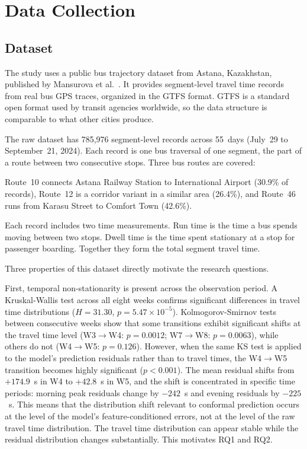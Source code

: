 \documentclass[12pt, a4paper, oneside]{report}
\begin{document}
\section{Data Collection}
\label{sec:data_collection}

\subsection{Dataset}
\label{subsec:dataset}

The study uses a public bus trajectory dataset from Astana, Kazakhstan, published by Mansurova et al.~\cite{mansurova2025dataset}. It provides segment-level travel time records from real bus GPS traces, organized in the GTFS format. GTFS is a standard open format used by transit agencies worldwide, so the data structure is comparable to what other cities produce.

The raw dataset has 785,976 segment-level records across 55~days (July~29 to September~21, 2024). Each record is one bus traversal of one segment, the part of a route between two consecutive stops. Three bus routes are covered:

Route~10 connects Astana Railway Station to International Airport (30.9\% of records), Route~12 is a corridor variant in a similar area (26.4\%), and Route~46 runs from Karasu Street to Comfort Town (42.6\%).

Each record includes two time measurements. Run time is the time a bus spends moving between two stops. Dwell time is the time spent stationary at a stop for passenger boarding. Together they form the total segment travel time.

Three properties of this dataset directly motivate the research questions.

First, temporal non-stationarity is present across the observation period. A Kruskal-Wallis test across all eight weeks confirms significant differences in travel time distributions ($H=31.30$, $p=5.47\times10^{-5}$). Kolmogorov-Smirnov tests between consecutive weeks show that some transitions exhibit significant shifts at the travel time level (W3$\rightarrow$W4: $p=0.0012$; W7$\rightarrow$W8: $p=0.0063$), while others do not (W4$\rightarrow$W5: $p=0.126$). However, when the same KS test is applied to the model's prediction residuals rather than to travel times, the W4$\rightarrow$W5 transition becomes highly significant ($p<0.001$). The mean residual shifts from $+174.9$~s in W4 to $+42.8$~s in W5, and the shift is concentrated in specific time periods: morning peak residuals change by $-242$~s and evening residuals by $-225$~s. This means that the distribution shift relevant to conformal prediction occurs at the level of the model's feature-conditioned errors, not at the level of the raw travel time distribution. The travel time distribution can appear stable while the residual distribution changes substantially. This motivates RQ1 and RQ2.
\end{document}

